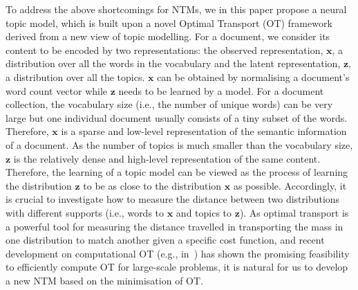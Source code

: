 \documentclass{article}
\renewcommand{\vec}{\boldsymbol}
\begin{document}
To address the above shortcomings for NTMs, we in this paper propose a neural topic model, which is built upon a novel Optimal Transport (OT) framework derived from a new view of topic modelling.
For a document, we consider its content to be encoded by two representations: the observed representation, $\vec{x}$, a distribution over all the words in the vocabulary and the latent representation, $\vec{z}$, a distribution over all the topics.
$\vec{x}$ can be obtained by normalising a document's word count vector while $\vec{z}$ needs to be learned by a model.
For a document collection, the vocabulary size (i.e., the number of unique words) can be very large but one individual document usually consists of a tiny subset of the words. Therefore, $\vec{x}$ is a sparse and low-level representation of the semantic information of a document.
As the number of topics is much smaller than the vocabulary size, $\vec{z}$ is the relatively dense and high-level representation of the same content.
Therefore, the learning of a topic model can be viewed as the process of learning the distribution $\vec{z}$ to be as close to the distribution $\vec{x}$ as possible.
Accordingly, it is crucial to investigate how to measure the distance between two distributions with different supports (i.e., words to $\vec{x}$ and topics to $\vec{z}$).
As optimal transport is a powerful tool for measuring the distance travelled in transporting the mass in one distribution to match another given a specific cost function,
and recent development on computational OT (e.g., in~\citet{cuturi2013sinkhorn,frogner2015learning,seguy2018large,peyre2019computational}) has shown the promising feasibility to efficiently compute OT for large-scale problems, it is natural for us to develop a new NTM based on the minimisation of OT.
\end{document}
